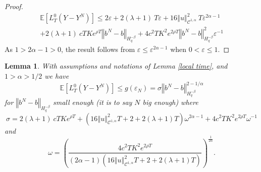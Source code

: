 \documentclass[12pt]{article}
\newtheorem{lem}[theo]{Lemma}
\newcommand{\norme}[1]{\left\Vert #1\right\Vert}
\newcommand{\E}{\mathbb{E}}
\begin{document}
\begin{proof}
    \begin{multline*}
    \E\left[L^0_T(Y-Y^N)\right]\leq 2\varepsilon + 2(\lambda + 1)\ T\varepsilon
    +16\norme{u}_{\mathcal{C}^{1,\alpha}}^2\ T \varepsilon^{2\alpha-1}\\
    +2(\lambda + 1)\ cT Ke^{\rho T}\norme{b^N-b}_{H^{-\beta}_{q}} +4c^2T K^2e^{2\rho T}\norme{b^N-b}_{H^{-\beta}_{q}}^2\varepsilon^{-1}
    \end{multline*}    
    As $1>2\alpha-1>0$, the result follows from $\varepsilon\leq\varepsilon^{2\alpha-1}$ when $0<\varepsilon\leq1$.  
    
\end{proof}

\begin{lem}\label{key lemma}
    With assumptions and notations of Lemma \ref{local time}, and $1>\alpha>1/2$ we have
    \begin{equation}
    \E\left[L^0_T(Y-Y^N)\right]\leq g(\varepsilon_N) = \sigma\norme{b^N-b}_{H^{-\beta}_{q}}^{2-1/\alpha}
    \end{equation}
    for $\norme{b^N-b}_{H^{-\beta}_{q}}$ small enough (it is to say $N$ big enough) where \begin{equation*}
    \sigma = 2(\lambda + 1)\ cT Ke^{\rho T} + \left(16\norme{u}_{\mathcal{C}^{1,\alpha}}^2 T + 2 + 2(\lambda + 1)T\right) \omega^{2\alpha-1} + 4c^2T K^2e^{2\rho T}\omega^{-1}
    \end{equation*} and \begin{equation*}
    \omega = \left(\frac{4c^2T K^2e^{2\rho T}}{(2\alpha-1)\left(16\norme{u}_{\mathcal{C}^{1,\alpha}}^2 T + 2 + 2(\lambda + 1)T\right)}\right)^{\frac{1}{2\alpha}}.
    \end{equation*}
\end{lem}
\end{document}
